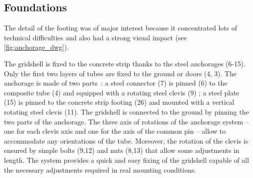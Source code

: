 

\pagebreak
\subsection{Foundations}
The detail of the footing was of major interest because it concentrated lots of technical difficulties and also had a strong visual impact (see \cref{fig:anchorage_dwg}).

The gridshell is fixed to the concrete strip thanks to the steel anchorages (6-15). Only the first two layers of tubes are fixed to the ground or doors (4, 3). The anchorage is made of two parts~: a steel connector (7) is pinned (6) to the composite tube (4) and equipped with a rotating steel clevis (9) ; a steel plate (15) is pinned to the concrete strip footing (26) and mounted with a vertical rotating steel clevis (11). The gridshell is connected to the ground by pinning the two parts of the anchorage. The three axis of rotations of the anchorage system -- one for each clevis axis and one for the axis of the common pin -- allow to accommodate any orientations of the tube. Moreover, the rotation of the clevis is ensured by simple bolts (9,12) and nuts (8,13) that allow some adjustments in length. The system provides a quick and easy fixing of the gridshell capable of all the necessary adjustments required in real mounting conditions.

